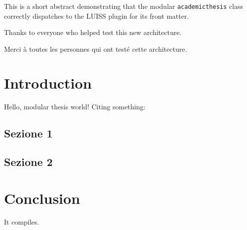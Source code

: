 \documentclass[university=luiss, bachelor, language=italian, twoside, discussion]{academicthesis}
\begin{document}
\frontpage

\frontmatter
\begin{abstractthesis}
  This is a short abstract demonstrating that the modular
  \texttt{academicthesis} class correctly dispatches to the
  LUISS plugin for its front matter.
  
  \lipsum[1-2]
\end{abstractthesis}




\dedication{To everyone who has ever fought with a LaTeX class file.}

\begin{acknowledgements}
  Thanks to everyone who helped test this new architecture.
\end{acknowledgements}

\begin{acknowledgements}[language=french]
  Merci à toutes les personnes qui ont testé cette architecture.
\end{acknowledgements}

\tableofcontents

\mainmatter
\chapter{Introduction}
Hello, modular thesis world! Citing something: %

\section{Sezione 1}

\section{Sezione 2}
\chapter{Conclusion}
It compiles.

\backmatter
\end{document}
